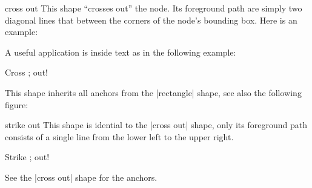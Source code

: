 \begin{shape}{cross out}
  This shape ``crosses out'' the node. Its foreground path are simply
  two diagonal lines that between the corners of the node's bounding
  box. Here is an example:

\begin{codeexample}[]
\end{codeexample}

  A useful application is inside text as in the following example:
\begin{codeexample}[]
Cross \tikz[baseline] ; out!  
\end{codeexample}

  This shape inherits all anchors from the |rectangle| shape, see also
  the following figure:
\begin{codeexample}[]
\Huge
{}
\end{codeexample}
\end{shape}

\begin{shape}{strike out}
  This shape is idential to the |cross out| shape, only its foreground
  path consists of a single line from the lower left to the upper
  right.
  
\begin{codeexample}[]
Strike \tikz[baseline] ; out!  
\end{codeexample}

  See the |cross out| shape for the anchors.
\end{shape}




